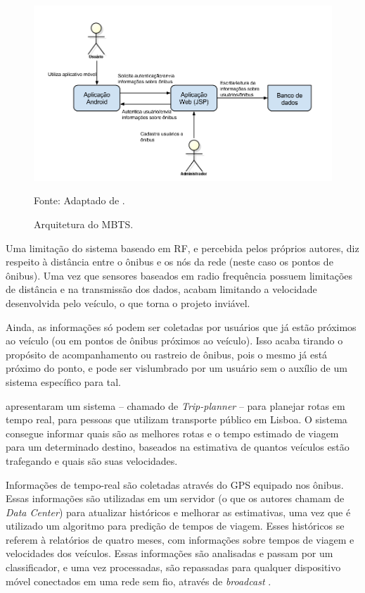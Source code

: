 \begin{figure}[h]
\begin{center}
    \includegraphics[width=1\columnwidth]{../figs/arquitetura_mbts.png}
    \caption{Arquitetura do MBTS.}Fonte: Adaptado de \cite{sujatha}.
    \label{fig:archMBTS}
\end{center}
\end{figure}

Uma limitação do sistema baseado em RF, e percebida pelos próprios autores, diz respeito à distância entre o ônibus e os nós da rede (neste caso os pontos de ônibus). Uma vez que sensores baseados em radio frequência possuem limitações de distância e na transmissão dos dados, acabam limitando a velocidade desenvolvida pelo veículo, o que torna o projeto inviável. 

Ainda, as informações só podem ser coletadas por usuários que já estão próximos ao veículo (ou em pontos de ônibus próximos ao veículo). Isso acaba tirando o propósito de acompanhamento ou rastreio de ônibus, pois o mesmo já está próximo do ponto, e pode ser vislumbrado por um usuário sem o auxílio de um sistema específico para tal.

 apresentaram um sistema -- chamado de \emph{Trip-planner} -- para planejar rotas em tempo real, para pessoas que utilizam transporte público em Lisboa. O sistema consegue informar quais são as melhores rotas e o tempo estimado de viagem para um determinado destino, baseados na estimativa de quantos veículos estão trafegando e quais são suas velocidades.

Informações de tempo-real são coletadas através do GPS equipado nos ônibus. Essas informações são utilizadas em um servidor (o que os autores chamam de \emph{Data Center}) para atualizar históricos e melhorar as estimativas, uma vez que é utilizado um algoritmo para predição de tempos de viagem. Esses históricos se referem à relatórios de quatro meses, com informações sobre tempos de viagem e velocidades dos veículos. Essas informações são analisadas e passam por um classificador, e uma vez processadas, são repassadas para qualquer dispositivo móvel conectados em uma rede sem fio, através de \emph{broadcast} \cite{alves}.

